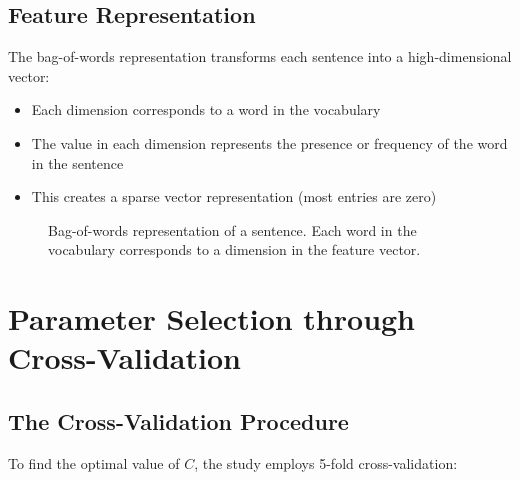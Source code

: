 \documentclass{article}
\begin{document}
\subsection{Feature Representation}
The bag-of-words representation transforms each sentence into a high-dimensional vector:

\begin{itemize}
    \item Each dimension corresponds to a word in the vocabulary
    \item The value in each dimension represents the presence or frequency of the word in the sentence
    \item This creates a sparse vector representation (most entries are zero)
\end{itemize}

\begin{figure}[h]
\centering
{}
\caption{Bag-of-words representation of a sentence. Each word in the vocabulary corresponds to a dimension in the feature vector.}
\end{figure}

\section{Parameter Selection through Cross-Validation}

\subsection{The Cross-Validation Procedure}
To find the optimal value of $C$, the study employs 5-fold cross-validation:
\end{document}

